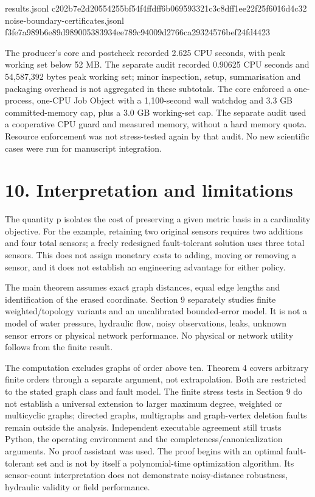 \documentclass[
]{article}
\newenvironment{Shaded}{}{}
\newcommand{\NormalTok}[1]{#1}
\begin{document}
\begin{Shaded}
\begin{Highlighting}[]
\NormalTok{results.jsonl}
\NormalTok{c202b7e2d20554255bf54f4ffdff6b069593321c3c8dff1ee22f25f6016d4c32}
\NormalTok{noise{-}boundary{-}certificates.jsonl}
\NormalTok{f3fe7a989b6e89d989005383934ee789c94009d2766ca29324576bef24fd4423}
\end{Highlighting}
\end{Shaded}

The producer's core and postcheck recorded 2.625 CPU seconds, with peak
working set below 52 MB. The separate audit recorded 0.90625 CPU seconds
and 54,587,392 bytes peak working set; minor inspection, setup,
summarisation and packaging overhead is not aggregated in these
subtotals. The core enforced a one-process, one-CPU Job Object with a
1,100-second wall watchdog and 3.3 GB committed-memory cap, plus a 3.0
GB working-set cap. The separate audit used a cooperative CPU guard and
measured memory, without a hard memory quota. Resource enforcement was
not stress-tested again by that audit. No new scientific cases were run
for manuscript integration.

\section{10. Interpretation and
limitations}\label{interpretation-and-limitations}

The quantity p isolates the cost of preserving a given metric basis in a
cardinality objective. For the example, retaining two original sensors
requires two additions and four total sensors; a freely redesigned
fault-tolerant solution uses three total sensors. This does not assign
monetary costs to adding, moving or removing a sensor, and it does not
establish an engineering advantage for either policy.

The main theorem assumes exact graph distances, equal edge lengths and
identification of the erased coordinate. Section 9 separately studies
finite weighted/topology variants and an uncalibrated bounded-error
model. It is not a model of water pressure, hydraulic flow, noisy
observations, leaks, unknown sensor errors or physical network
performance. No physical or network utility follows from the finite
result.

The computation excludes graphs of order above ten. Theorem 4 covers
arbitrary finite orders through a separate argument, not extrapolation.
Both are restricted to the stated graph class and fault model. The
finite stress tests in Section 9 do not establish a universal extension
to larger maximum degree, weighted or multicyclic graphs; directed
graphs, multigraphs and graph-vertex deletion faults remain outside the
analysis. Independent executable agreement still trusts Python, the
operating environment and the completeness/canonicalization arguments.
No proof assistant was used. The proof begins with an optimal
fault-tolerant set and is not by itself a polynomial-time optimization
algorithm. Its sensor-count interpretation does not demonstrate
noisy-distance robustness, hydraulic validity or field performance.
\end{document}
